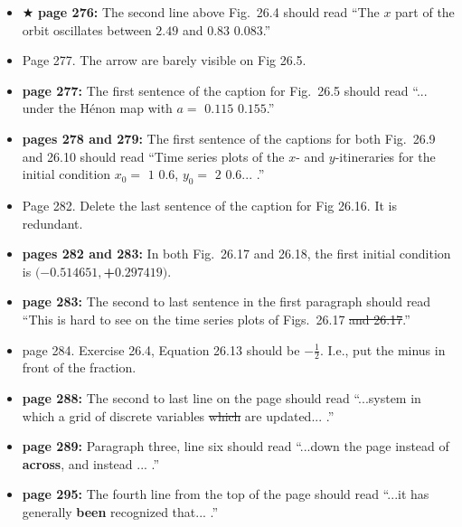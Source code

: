 \documentclass[12pt]{article}
\begin{document}
\begin{itemize}
  \item $\bigstar$ {\bf page 276:}  The second line above Fig.~26.4
    should read ``The $x$ part of the orbit oscillates between $2.49$
    and \sout{$0.83$} {\bf $0.083$}.'' 

  \item Page 277.  The arrow are barely visible on Fig 26.5.

  \item {\bf page 277:}  The first sentence of the caption for
    Fig.~26.5 should read ``... under the H\'enon map with $a = $
    \sout{$0.115$} {\bf $0.155$}.''


  \item {\bf pages 278 and 279:}  The first sentence of the captions
    for both Fig.~26.9 and 26.10 should read ``Time series plots of
    the $x$- and $y$-itineraries for the initial condition $x_0 =$
    \sout{$1$} {\bf $0.6$}, $y_0 =$ \sout{$2$} {\bf $0.6$}... .''

  \item Page 282.  Delete the last sentence of the caption for Fig 26.16.
   It is redundant.

  \item {\bf pages 282 and 283:}  In both Fig.~26.17 and 26.18, the
    first initial condition is $(-0.514651, ${\bf+}$0.297419)$.  

  \item {\bf page 283:}  The second to last sentence in the first
    paragraph should read ``This is hard to see on the time series
    plots of Figs.~26.17 \sout{and 26.17}.''

  \item page 284.  Exercise 26.4, Equation 26.13 should be $-\frac{1}{2}$.
   I.e., put the minus in front of the fraction. 

  \item {\bf page 288:} The second to last line on the page should
    read ``...system in which a grid of discrete variables
    \sout{which} are updated... .''

  \item {\bf page 289:} Paragraph three, line six should read
    ``...down the page instead of {\bf across}, and instead ... .'' 

  \item {\bf page 295:} The fourth line from the top of the page
    should read ``...it has generally {\bf been} recognized
    that... .'' 


\end{itemize}
\end{document}
